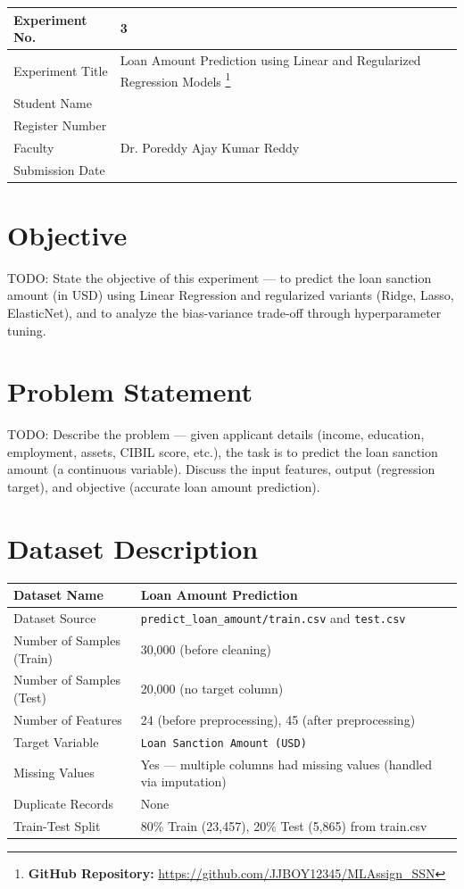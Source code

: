\documentclass[12pt,a4paper]{article}
\begin{document}
\begin{tabular}{|p{4cm}|p{11cm}|}
\hline
Experiment No. & 3 \\ \hline
Experiment Title &
Loan Amount Prediction using Linear and Regularized Regression Models
\footnote{\textbf{GitHub Repository: }\url{https://github.com/JJBOY12345/MLAssign_SSN}}\\ \hline
Student Name & \\ \hline
Register Number & \\ \hline
Faculty & Dr. Poreddy Ajay Kumar Reddy \\ \hline
Submission Date & \\ \hline
\end{tabular}

\section{Objective}
TODO: State the objective of this experiment — to predict the loan sanction amount (in USD) using Linear Regression and regularized variants (Ridge, Lasso, ElasticNet), and to analyze the bias-variance trade-off through hyperparameter tuning.

\section{Problem Statement}
TODO: Describe the problem — given applicant details (income, education, employment, assets, CIBIL score, etc.), the task is to predict the loan sanction amount (a continuous variable). Discuss the input features, output (regression target), and objective (accurate loan amount prediction).

\section{Dataset Description}
\begin{longtable}{|p{5cm}|p{9cm}|}
\hline
Dataset Name & Loan Amount Prediction \\ \hline
Dataset Source & \texttt{predict\_loan\_amount/train.csv} and \texttt{test.csv} \\ \hline
Number of Samples (Train) & 30,000 (before cleaning) \\ \hline
Number of Samples (Test) & 20,000 (no target column) \\ \hline
Number of Features & 24 (before preprocessing), 45 (after preprocessing) \\ \hline
Target Variable & \texttt{Loan Sanction Amount (USD)} \\ \hline
Missing Values & Yes — multiple columns had missing values (handled via imputation) \\ \hline
Duplicate Records & None \\ \hline
Train-Test Split & 80\% Train (23,457), 20\% Test (5,865) from train.csv \\ \hline
\end{longtable}
\end{document}
